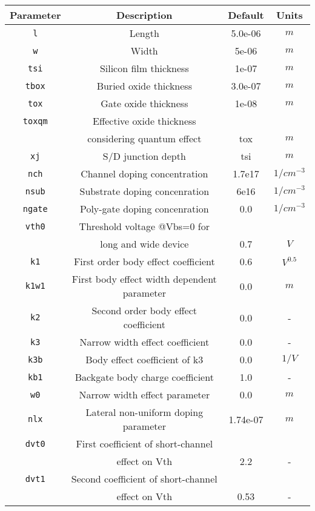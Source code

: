 \documentclass{article}
\begin{document}
\begin{table}[H]
\begin{tabular}{|c| c| c| c|}
\hline
\textbf{Parameter} & \textbf{Description} & \textbf{Default} & \textbf{Units} \\
\hline
\texttt{l} & Length & 5.0e-06 & $m$\\
\texttt{w} & Width & 5e-06 & $m$\\
\texttt{tsi} & Silicon film thickness & 1e-07 & $m$\\
\texttt{tbox} & Buried oxide thickness & 3.0e-07 & $m$\\
\texttt{tox} & Gate oxide thickness & 1e-08 & $m$ \\
\texttt{toxqm} & Effective oxide thickness & & \\
          & considering quantum effect & tox & $m$\\
\texttt{xj} & S/D junction depth & tsi & $m$\\
\texttt{nch} & Channel doping concentration & 1.7e17 & $1/cm^{-3}$\\
\texttt{nsub} & Substrate doping concenration & 6e16 & $1/cm^{-3}$\\
\texttt{ngate} & Poly-gate doping concenration & 0.0 & $1/cm^{-3}$\\
\texttt{vth0} & Threshold voltage @Vbs=0 for & &\\
               & long and wide device & 0.7 & $V$\\
\texttt{k1} & First order body effect coefficient & 0.6 & $V^0.5$\\
\texttt{k1w1} & First body effect width dependent parameter & 0.0 & $m$\\
\texttt{k2} & Second order body effect coefficient & 0.0 & -\\
\texttt{k3} & Narrow width effect coefficient & 0.0 & -\\
\texttt{k3b} & Body effect coefficient of k3 & 0.0 & $1/V$\\
\texttt{kb1} & Backgate body charge coefficient & 1.0 & -\\
\texttt{w0} & Narrow width effect parameter & 0.0 & $m$\\
\texttt{nlx} & Lateral non-uniform doping parameter & 1.74e-07 & $m$\\
\texttt{dvt0} & First coefficient of short-channel & &\\
                & effect on Vth & 2.2 & -\\
\texttt{dvt1} & Second coefficient of short-channel & & \\
             & effect on Vth & 0.53 & -\\

\end{tabular}
\end{table}
\end{document}
